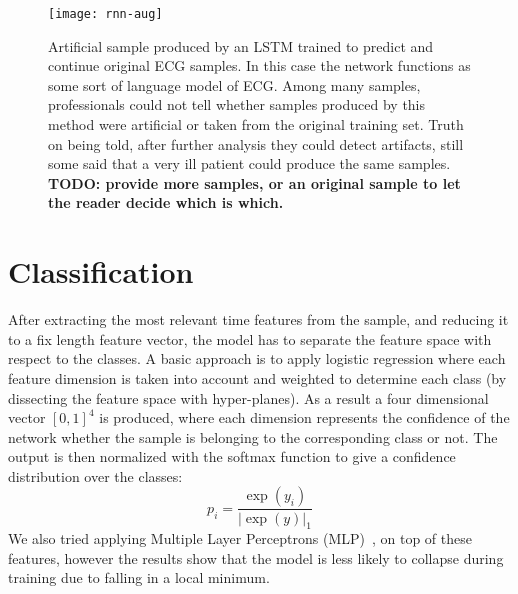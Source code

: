 \begin{figure}
  \centering
  \texttt{[image: rnn-aug]}\label{fig:rnn-aug}
  \caption{Artificial sample produced by an LSTM trained to predict and continue original ECG samples. In this case the network functions as some sort of language model of ECG. Among many samples, professionals could not tell whether samples produced by this method were artificial or taken from the original training set. Truth on being told, after further analysis they could detect artifacts, still some said that a very ill patient could produce the same samples. \textbf{TODO: provide more samples, or an original sample to let the reader decide which is which.}}
\end{figure}

\section{Classification}
After extracting the most relevant time features from the sample, and reducing it to a fix length feature vector, the model has to separate the feature space with respect to the classes.
A basic approach is to apply logistic regression where each feature dimension is taken into account and weighted to determine each class (by dissecting the feature space with hyper-planes).
As a result a four dimensional vector $[0, 1]^4$ is produced, where each dimension represents the confidence of the network whether the sample is belonging to the corresponding class or not. The output is then normalized with the softmax function to give a confidence distribution over the classes:
\begin{equation}
p_i = \frac{\exp(y_i)}{|\exp(y)|_1}
\end{equation}
We also tried applying Multiple Layer Perceptrons (MLP)~\cite{girshick2014rich}, on  top of these features, however the results show that the model is less likely to collapse during training due to falling in a local minimum.
